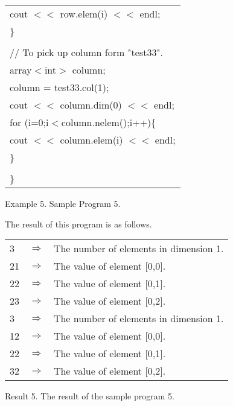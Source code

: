 {\begin{center}
\begin{tabular}{|l|}
\hspace*{20mm}cout $<<$ row.elem(i) $<<$ endl;\\
\hspace*{10mm}\}\\
\\
\hspace*{10mm}// To pick up column form "test33".\\
\hspace*{10mm}array$<$int$>$ column;\\
\hspace*{10mm}column = test33.col(1);\\
\hspace*{10mm}cout $<<$ column.dim(0) $<<$ endl;\\
\hspace*{10mm}for (i=0;i$<$column.nelem();i++)\{\\
\hspace*{20mm}cout $<<$ column.elem(i) $<<$ endl;\\
\hspace*{10mm}\}\\
\\
\}\\\hline
\end{tabular}
\vspace*{5mm}

Example 5. Sample Program 5.
\end{center}
}

\clearpage

\noindent
The result of this program is as follows.

\begin{center}
\begin{tabular}{|lll|}\hline
3  & $\Longrightarrow$  & The number of elements in dimension 1.\\
21 & $\Longrightarrow$  & The value of element [0,0].\\
22 & $\Longrightarrow$  & The value of element [0,1].\\
23 & $\Longrightarrow$  & The value of element [0,2].\\
3  & $\Longrightarrow$  & The number of elements in dimension 1.\\
12 & $\Longrightarrow$  & The value of element [0,0].\\
22 & $\Longrightarrow$  & The value of element [0,1].\\
32 & $\Longrightarrow$  & The value of element [0,2].\\\hline
\end{tabular}
\vspace*{5mm}

Result 5. The result of the sample program 5.
\end{center}

\clearpage






